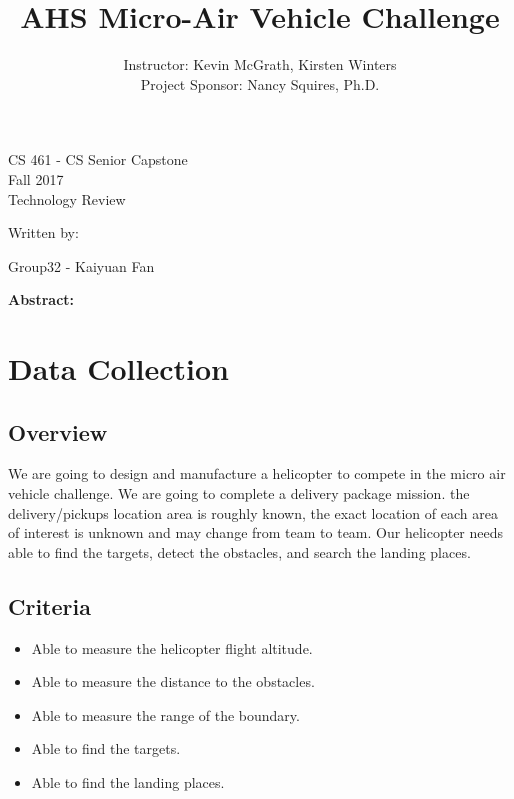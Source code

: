 \documentclass[letterpaper, 10, draftclsnofoot, onecolumn]{IEEEtran}
\date{}
\title{AHS Micro-Air Vehicle Challenge}
\author{ Instructor: Kevin McGrath, Kirsten Winters \\
    Project Sponsor: Nancy Squires, Ph.D.
}
\def\class{CS 461 - CS Senior Capstone}
\def\term{Fall 2017}
\begin{document}
\null  %
\nointerlineskip  %
\vfill
\let\snewpage \newpage
\let\newpage \relax
\maketitle
\begin{center}
\class\\
\term\\
\huge{Technology Review}\par
\vspace{2mm}
\large{Written by:}\par
\normalsize{Group32 - Kaiyuan Fan}\par
\vspace{8mm}
\large{\textbf{Abstract:}}\par 
\end{center}
\vspace{2mm}
\normalsize{


}

\let \newpage \snewpage
\vfill 
\break %

\tableofcontents

\section{Data Collection}
\subsection{Overview}
We are going to design and manufacture a helicopter to compete in the micro air vehicle challenge. We are going to complete a delivery package mission. the delivery/pickups location area is roughly known, the exact location of each area of interest is unknown and may change from team to team. Our helicopter needs able to find the targets, detect the obstacles, and search the landing places.


\subsection{Criteria}
\begin{itemize} 
\item Able to measure the helicopter flight altitude.
\item Able to measure the distance to the obstacles.
\item Able to measure the range of the boundary.
\item Able to find the targets.
\item 	Able to find the landing places.

\end{itemize}
\end{document}
